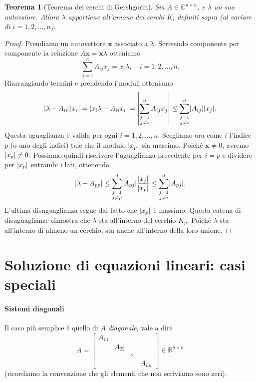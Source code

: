 \documentclass[a4paper]{report}
\DeclarePairedDelimiter{\abs}{\lvert}{\rvert}
\newtheorem{theorem}{Teorema}[chapter]
\theoremstyle{definiton}
\theoremstyle{remark}
\begin{document}
\begin{theorem}[Teorema dei cerchi di Gershgorin]
Sia $A\in\mathbb{C}^{n\times n}$, e $\lambda$ un suo autovalore. Allora $\lambda$ appartiene all'unione dei cerchi $K_i$ definiti sopra (al variare di $i=1,2,\dots,n$).
\end{theorem}
\begin{proof}
Prendiamo un autovettore $\mathbf{x}$ associato a $\lambda$. Scrivendo componente per componente la relazione $A\mathbf{x} = \mathbf{x}\lambda$ otteniamo
\[
\sum_{j=1}^n A_{ij}x_j = x_i \lambda, \quad i=1,2,\dots,n.
\]
Riarrangiando termini e prendendo i moduli otteniamo
\[
\abs{\lambda - A_{ii}}\abs{x_i} = \abs{x_i\lambda - A_{ii}x_i} = \abs*{\sum_{\substack{j=1\\ j \neq i}}^n A_{ij}x_j} \leq \sum_{\substack{j=1\\ j \neq i}}^n \abs{A_{ij}}\abs{x_j}.
\]
Questa uguaglianza è valida per ogni $i=1,2,\dots,n$. Scegliamo ora come $i$ l'indice $p$ (o uno degli indici) tale che il modulo $\abs{x_p}$ sia massimo. Poiché $\mathbf{x}\neq 0$, avremo $\abs{x_p} \neq 0$. Possiamo quindi riscrivere l'uguaglianza precedente per $i=p$ e dividere per $\abs{x_p}$ entrambi i lati, ottenendo
\[
\abs{\lambda - A_{pp}} \leq \sum_{\substack{j=1\\ j \neq p}}^n \abs{A_{pj}}\frac{\abs{x_j}}{\abs{x_p}} \leq \sum_{\substack{j=1\\ j \neq i}}^n \abs{A_{pj}}.
\]
L'ultima disuguaglianza segue dal fatto che $\abs{x_p}$ è massimo. Questa catena di disuguaglianze dimostra che $\lambda$ sta all'interno del cerchio $K_p$. Poiché $\lambda$ sta all'interno di almeno un cerchio, sta anche all'interno della loro unione.
\end{proof}


\section{Soluzione di equazioni lineari: casi speciali}

\paragraph{Sistemi diagonali}

Il caso più semplice è quello di $A$ \emph{diagonale}, vale a dire
\[  
A = \begin{bmatrix}
    A_{11} \\
    & A_{22}\\
    && \ddots\\
    &&& A_{nn}
\end{bmatrix} \in \mathbb{R}^{n \times n}
\]
(ricordiamo la convenzione che gli elementi che non scriviamo sono zeri).
\end{document}
